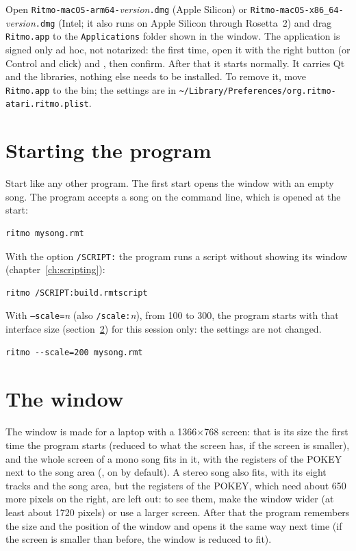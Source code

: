 Open \texttt{Ritmo-macOS-arm64-}\emph{version}\texttt{.dmg} (Apple Silicon) or \texttt{Ritmo-macOS-x86\_64-}\emph{version}\texttt{.dmg} (Intel; it also runs on Apple Silicon
through Rosetta~2) and drag \texttt{Ritmo.app} to the \texttt{Applications} folder shown in the window. The application is signed
only ad hoc, not notarized: the first time, open it with the right button (or Control and click) and , then confirm.
After that it starts normally. It carries Qt and the libraries, nothing else needs to be installed. To remove it, move
\texttt{Ritmo.app} to the bin; the settings are in \texttt{\textasciitilde/Library/Preferences/org.ritmo-atari.ritmo.plist}.

\section{Starting the program}

Start \RITMO{} like any other program. The first start opens the window with an empty song.
The program accepts a song on the command line, which is opened at the start:
\begin{lstlisting}
ritmo mysong.rmt
\end{lstlisting}

With the option \texttt{/SCRIPT:} the program runs a script without showing its window
(chapter~\ref{ch:scripting}):
\begin{lstlisting}
ritmo /SCRIPT:build.rmtscript
\end{lstlisting}

With \texttt{--scale=}\emph{n} (also \texttt{/scale:}\emph{n}), from 100 to 300, the program starts with that interface size
(section~\ref{sec:window}) for this session only: the settings are not changed.
\begin{lstlisting}
ritmo --scale=200 mysong.rmt
\end{lstlisting}

\section{The window}\label{sec:window}

The window is made for a laptop with a 1366$\times$768 screen: that is its size the first time the program starts (reduced to what the screen has, if
the screen is smaller), and the whole screen of a mono song fits in it, with the registers of the POKEY next to the song area (, on by
default). A stereo song also fits, with its eight tracks and the song area, but the registers of the POKEY, which need about 650 more pixels on
the right, are left out: to see them, make the window wider (at least about 1720 pixels) or use a larger screen. After that the program remembers the size and the position of the window
and opens it the same way next time (if the screen is smaller than before, the window is reduced to fit).

